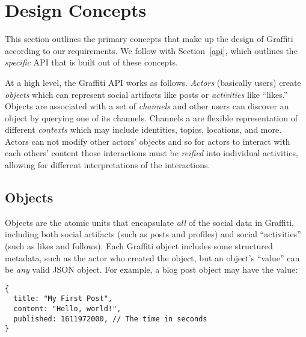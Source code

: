 \section{Design Concepts}
\label{concepts}

This section outlines the primary concepts that make up the design of Graffiti
according to our requirements.
We follow with Section~\ref{api}, which outlines the \emph{specific} API that is built out of these
concepts.

At a high level, the Graffiti API works as follows.
\emph{Actors} (basically users) create \emph{objects} which can represent
social artifacts like posts or \emph{activities} like ``likes.''
Objects are associated with a set of \emph{channels} and other users can
discover an object by querying one of its channels. Channels a are flexible representation
of different \emph{contexts} which may include identities, topics, locations,
and more.
Actors can not modify other actors' objects and so for actors to interact with each others' content
those interactions must be \emph{reified} into individual activities,
allowing for different interpretations of the interactions.


\subsection{Objects}
\label{concepts:objects}

Objects are the atomic units that encapsulate \emph{all}
of the social data in Graffiti, including
both social artifacts (such as posts and profiles) and social ``activities'' (such as likes and follows).
Each Graffiti object includes some structured metadata,
such as the actor who created the object,
but an object's ``value'' can be \emph{any} valid JSON object.
For example, a blog post object may have the value:

\begin{verbatim}
{
  title: "My First Post",
  content: "Hello, world!",
  published: 1611972000, // The time in seconds
}
\end{verbatim}

